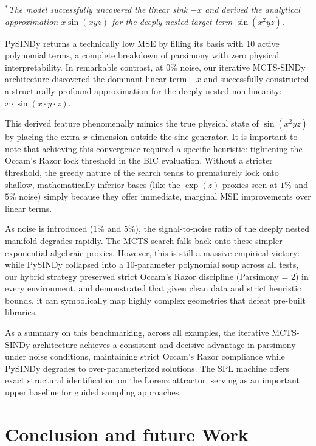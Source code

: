 \documentclass[11pt, a4paper]{article}
\begin{document}
\noindent $^*$\textit{The model successfully uncovered the linear sink $-x$ and derived the analytical approximation $x \sin(xyz)$ for the deeply nested target term $\sin(x^2 y z)$.}

\vspace{0.3cm}
\noindent PySINDy returns a technically low MSE by filling its basis with 10 active polynomial terms, a complete breakdown of parsimony with zero physical interpretability. In remarkable contrast, at $0\%$ noise, our iterative MCTS-SINDy architecture discovered the dominant linear term $-x$ and successfully constructed a structurally profound approximation for the deeply nested non-linearity: $x \cdot \sin(x \cdot y \cdot z)$. 

This derived feature phenomenally mimics the true physical state of $\sin(x^2 y z)$ by placing the extra $x$ dimension outside the sine generator. It is important to note that achieving this convergence required a specific heuristic: tightening the Occam's Razor lock threshold in the BIC evaluation. Without a stricter threshold, the greedy nature of the search tends to prematurely lock onto shallow, mathematically inferior bases (like the $\exp(z)$ proxies seen at $1\%$ and $5\%$ noise) simply because they offer immediate, marginal MSE improvements over linear terms.

As noise is introduced ($1\%$ and $5\%$), the signal-to-noise ratio of the deeply nested manifold degrades rapidly. The MCTS search falls back onto these simpler exponential-algebraic proxies. However, this is still a massive empirical victory: while PySINDy collapsed into a 10-parameter polynomial soup across all tests, our hybrid strategy preserved strict Occam's Razor discipline (Parsimony = 2) in every environment, and demonstrated that given clean data and strict heuristic bounds, it can symbolically map highly complex geometries that defeat pre-built libraries.

\vspace{0.3cm}
As a summary on this benchmarking, across all examples, the iterative MCTS-SINDy architecture achieves a consistent and decisive advantage in parsimony under noise conditions, maintaining strict Occam's Razor compliance while PySINDy degrades to over-parameterized solutions. The SPL machine offers exact structural identification on the Lorenz attractor, serving as an important upper baseline for guided sampling approaches.


\newpage
\section{Conclusion and future Work}
\label{sec:conclusion}
\end{document}
